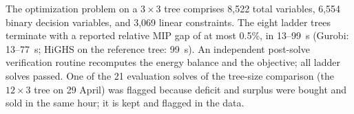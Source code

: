 \documentclass[5p,times,twocolumn]{elsarticle}
\begin{document}
The optimization problem on a $3\times3$ tree comprises 8,522 total variables, 6,554 binary decision variables, and 3,069 linear constraints. The eight ladder trees terminate with a reported relative MIP gap of at most 0.5\%, in 13--99~s (Gurobi: 13--77~s; HiGHS on the reference tree: 99~s). An independent post-solve verification routine recomputes the energy balance and the objective; all ladder solves passed. One of the 21 evaluation solves of the tree-size comparison (the $12\times3$ tree on 29 April) was flagged because deficit and surplus were bought and sold in the same hour; it is kept and flagged in the data.

\end{document}
